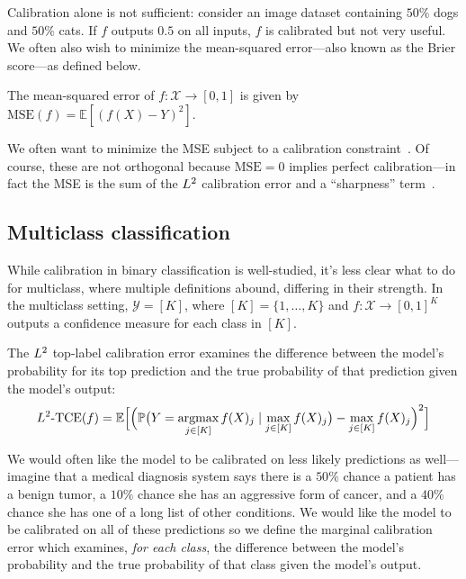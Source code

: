 Calibration alone is not sufficient: consider an image dataset containing $50\%$ dogs and $50\%$ cats.
If $f$ outputs $0.5$ on all inputs, $f$ is calibrated but not very useful.
We often also wish to minimize the mean-squared error---also known as the Brier score---as defined below.

\begin{definition}
The mean-squared error of $f : \mathcal{X} \to [0, 1]$ is given by $\mbox{MSE}(f) = \mathbb{E}[(f(X) - Y)^2]$.
\end{definition}

We often want to minimize the MSE subject to a calibration constraint~\cite{gneiting2005weather, gneiting2007probabilistic}. Of course, these are not orthogonal because $\mbox{MSE} = 0$ implies perfect calibration---in fact the MSE is the sum of the $L^2$ calibration error and a ``sharpness'' term~\cite{murphy1973vector,degroot1983forecasters, kuleshov2015calibrated}.

\subsection{Multiclass classification}

While calibration in binary classification is well-studied,
it's less clear what to do for multiclass, where multiple definitions abound, differing in their strength. In the multiclass setting, $\mathcal{Y} = [K]$, where $[K] = \{1, \dots, K\}$ and $f : \mathcal{X} \to [0, 1]^K$ outputs a confidence measure for each class in $[K]$.

\begin{definition}
The $L^2$ top-label calibration error examines the difference between the model's probability for its top prediction and the true probability of that prediction given the model's output:
\begin{align}
L^2\mbox{-TCE}(f) = \mathbb{E}\Big[ \Big( \mathbb{P}\big(Y = \mathop{\mbox{argmax}}_{j \in [K]} f(X)_j \mid \max_{j \in [K]} f(X)_j\big) - \max_{j \in [K]} f(X)_j \Big)^2 \Big]
\end{align}
\end{definition}

We would often like the model to be calibrated on less likely predictions as well---imagine that a medical diagnosis system says there is a $50\%$ chance a patient has a benign tumor, a $10\%$ chance she has an aggressive form of cancer, and a $40\%$ chance she has one of a long list of other conditions. We would like the model to be calibrated on all of these predictions so we define the marginal calibration error which examines, \emph{for each class}, the difference between the model's probability and the true probability of that class given the model's output.

